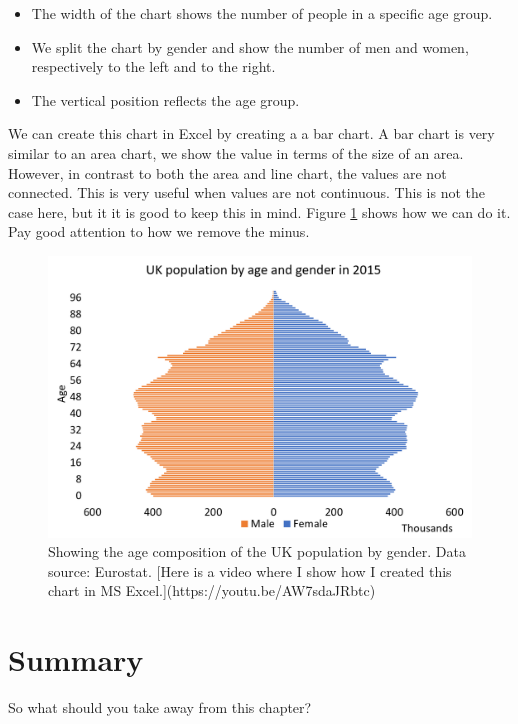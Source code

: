 \documentclass[]{book}
\providecommand{\tightlist}{%
  \setlength{\itemsep}{0pt}\setlength{\parskip}{0pt}}
\begin{document}
\begin{itemize}
\tightlist
\item
  The width of the chart shows the number of people in a specific age group.
\item
  We split the chart by gender and show the number of men and women, respectively to the left and to the right.
\item
  The vertical position reflects the age group.
\end{itemize}

We can create this chart in Excel by creating a a bar chart. A bar chart is very similar to an area chart, we show the value in terms of the size of an area. However, in contrast to both the area and line chart, the values are not connected. This is very useful when values are not continuous. This is not the case here, but it it is good to keep this in mind. Figure \ref{fig:pyramid} shows how we can do it. Pay good attention to how we remove the minus.

\begin{figure}

{\centering \includegraphics[width=0.8\linewidth]{_resources/chapter_people/pyramid} 

}

\caption{Showing the age composition of the UK population by gender. Data source: Eurostat. [Here is a video where I show how I created this chart in MS Excel.](https://youtu.be/AW7sdaJRbtc)}\label{fig:pyramid}
\end{figure}

\hypertarget{people:sum}{%
\section{Summary}\label{people:sum}}

So what should you take away from this chapter?
\end{document}
